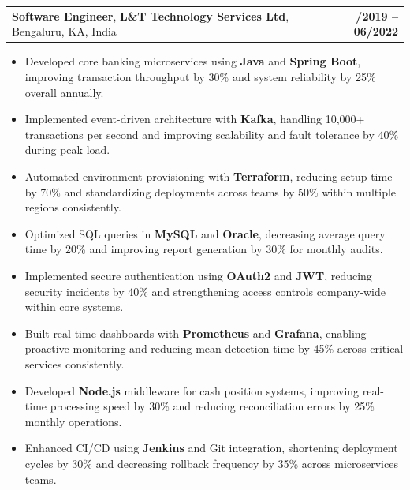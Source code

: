 \documentclass[letterpaper,11pt]{article}
\makeatletter
\newcommand{\resumeItem}[1]{
  \item\footnotesize{
    {#1 \vspace{-2pt}}
  }
}
\newcommand{\resumeSubheading}[4]{
  \vspace{-2pt}\item
    \begin{tabular*}{1.0\textwidth}[t]{l@{\extracolsep{\fill}}r}
      \textbf{\fontsize{10pt}{14pt}\selectfont #3}, \textbf{\fontsize{10pt}{14pt}\selectfont #1}, \fontsize{10pt}{14pt}\selectfont #4 & \textbf{\fontsize{10pt}{14pt}\selectfont #2} \\
    \end{tabular*}\vspace{-7pt}
}
\newcommand{\resumeItemListStart}{\begin{itemize}[leftmargin=*]}
\newcommand{\resumeItemListEnd}{\end{itemize}\vspace{-5pt}}
\makeatother
\begin{document}
    \resumeSubheading
        {L\&T Technology Services Ltd}{08/2019 -- 06/2022}
        {Software Engineer}{Bengaluru, KA, India}
      \resumeItemListStart
        \resumeItem{Developed core banking microservices using \textbf{Java} and \textbf{Spring Boot}, improving transaction throughput by 30\% and system reliability by 25\% overall annually.}
        \resumeItem{Implemented event-driven architecture with \textbf{Kafka}, handling 10,000+ transactions per second and improving scalability and fault tolerance by 40\% during peak load.}
        \resumeItem{Automated environment provisioning with \textbf{Terraform}, reducing setup time by 70\% and standardizing deployments across teams by 50\% within multiple regions consistently.}
        \resumeItem{Optimized SQL queries in \textbf{MySQL} and \textbf{Oracle}, decreasing average query time by 20\% and improving report generation by 30\% for monthly audits.}
        \resumeItem{Implemented secure authentication using \textbf{OAuth2} and \textbf{JWT}, reducing security incidents by 40\% and strengthening access controls company-wide within core systems.}
        \resumeItem{Built real-time dashboards with \textbf{Prometheus} and \textbf{Grafana}, enabling proactive monitoring and reducing mean detection time by 45\% across critical services consistently.}
        \resumeItem{Developed \textbf{Node.js} middleware for cash position systems, improving real-time processing speed by 30\% and reducing reconciliation errors by 25\% monthly operations.}
        \resumeItem{Enhanced CI/CD using \textbf{Jenkins} and Git integration, shortening deployment cycles by 30\% and decreasing rollback frequency by 35\% across microservices teams.}
      \resumeItemListEnd
\end{document}
